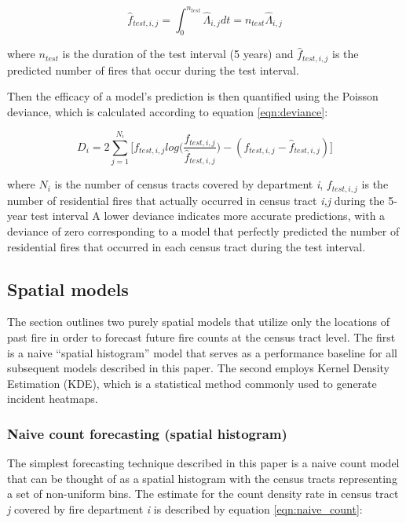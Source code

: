 \documentclass{svjour3}
\begin{document}
\begin{equation}
  \label{eqn:rate_integral}
  \hat{f}_{test,i,j} = \int_{0}^{n_{test}}\hat\Lambda_{i,j}dt
  = n_{test}\hat\Lambda_{i,j}
\end{equation}

\noindent where $n_{test}$ is the duration of the test interval (5 years) and $\hat{f}_{test,i,j}$ is the predicted number of fires that occur during the test interval.

Then the efficacy of a model's prediction is then quantified using the Poisson deviance, which is calculated according to equation \ref{eqn:deviance}:

\begin{equation}
  \label{eqn:deviance}
  D_i = 2\sum_{j=1}^{N_i}\bigg[
   f_{test,i,j}log\big(\frac{f_{test,i,j}}{\hat{f}_{test,i,j}}\big) - 
   (f_{test,i,j}-\hat{f}_{test,i,j}) 
  \bigg]
\end{equation}

\noindent where $N_i$ is the number of census tracts covered by department \textit{i}, $f_{test,i,j}$ is the number of residential fires that actually occurred in census tract \textit{i,j} during the 5-year test interval A lower deviance indicates more accurate predictions, with a deviance of zero corresponding to a model that perfectly predicted the number of residential fires that occurred in each census tract during the test interval.



\subsection{Spatial models}
The section outlines two purely spatial models that utilize only the locations of past fire in order to forecast future fire counts at the census tract level. The first is a naive ``spatial histogram'' model that serves as a performance baseline for all subsequent models described in this paper. The second employs Kernel Density Estimation (KDE), which is a statistical method commonly used to generate incident heatmaps. 

\subsubsection{Naive count forecasting (spatial histogram)}
The simplest forecasting technique described in this paper is a naive count model that can be thought of as a spatial histogram with the census tracts representing a set of non-uniform bins. The estimate for the count density rate in census tract \textit{j} covered by fire department \textit{i} is described by equation \ref{eqn:naive_count}:
\end{document}
